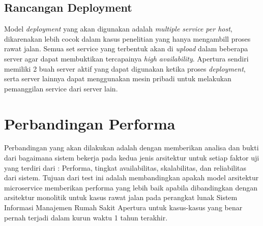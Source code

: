 \subsection{Rancangan Deployment}
Model \textit{deployment} yang akan digunakan adalah \textit{multiple service per host}, dikarenakan lebih cocok dalam kasus penelitian yang hanya mengambill proses rawat jalan. Semua set service yang terbentuk akan di \textit{upload} dalam beberapa server agar dapat membuktikan tercapainya \textit{high availability}. Apertura sendiri memiliki 2 buah server aktif yang dapat digunakan ketika proses \textit{deployment}, serta server lainnya dapat menggunakan mesin pribadi untuk melakukan pemanggilan service dari server lain.
\section{Perbandingan Performa}
Perbandingan yang akan dilakukan adalah dengan memberikan analisa dan bukti dari bagaimana sistem bekerja pada kedua jenis arsitektur untuk setiap faktor uji yang terdiri dari : Performa, tingkat availabilitas, skalabilitas, dan reliabilitas dari sistem.
Tujuan dari test ini adalah membandingkan apakah model arsitektur microservice memberikan performa yang lebih baik apabila dibandingkan dengan arsitektur monolitik untuk kasus rawat jalan pada perangkat lunak Sistem Informasi Manajemen Rumah Sakit Apertura untuk kasus-kasus yang benar pernah terjadi dalam kurun waktu 1 tahun terakhir.

